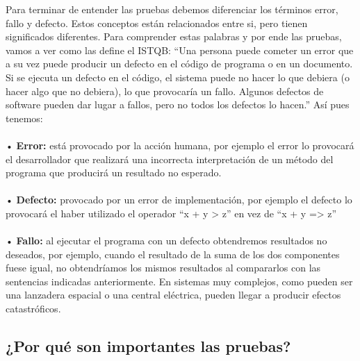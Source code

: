 \documentclass[12pt,letterpaper]{article}
\begin{document}
    Para terminar de entender las pruebas debemos diferenciar los términos error, fallo y defecto. Estos conceptos están relacionados entre si, pero tienen significados diferentes. Para comprender estas palabras y por ende las pruebas, vamos a ver como las define el ISTQB:
    “Una persona puede cometer un error que a su vez puede producir un defecto en el código de programa o en un documento. Si se ejecuta un defecto en el código, el sistema puede no hacer lo que debiera (o hacer algo que no debiera), lo que provocaría un fallo. Algunos defectos de software pueden dar lugar a fallos, pero no todos los defectos lo hacen.”
    Así pues tenemos:
    \\
    \\
    •	\textbf{Error:} está provocado por la acción humana, por ejemplo el error lo provocará el desarrollador que realizará una incorrecta interpretación de un método del programa que producirá un resultado no esperado.
    \\
    \\
    •	\textbf{Defecto:} provocado por un error de implementación, por ejemplo el defecto lo provocará el haber utilizado el operador “x + y > z” en vez de “x + y => z”
    \\
    \\
    •	\textbf{Fallo:} al ejecutar el programa con un defecto obtendremos resultados no deseados, por ejemplo, cuando el resultado de la suma de los dos componentes fuese igual, no obtendríamos los mismos resultados al compararlos con las sentencias indicadas anteriormente. En sistemas muy complejos, como pueden ser una lanzadera espacial o una central eléctrica, pueden llegar a producir efectos catastróficos.
    
    \subsection{¿Por qué son importantes las pruebas?}
\end{document}
